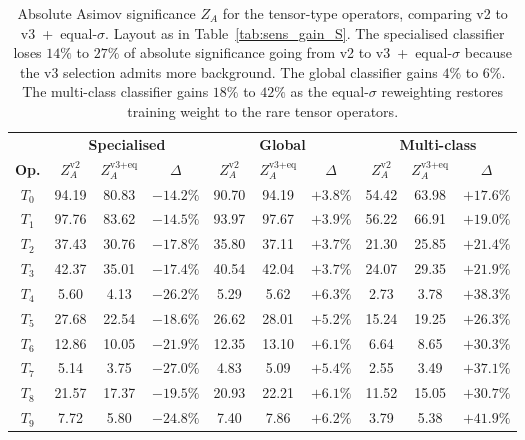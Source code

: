 \begin{table}[htbp]
  \centering
  \caption{Absolute Asimov significance $Z_A$ for the tensor-type operators, comparing v2 to v3~+~equal-$\sigma$. Layout as in Table~\ref{tab:sens_gain_S}. The specialised classifier loses $14\%$ to $27\%$ of absolute significance going from v2 to v3~+~equal-$\sigma$ because the v3 selection admits more background. The global classifier gains $4\%$ to $6\%$. The multi-class classifier gains $18\%$ to $42\%$ as the equal-$\sigma$ reweighting restores training weight to the rare tensor operators.}
  \label{tab:sens_gain_T}
  \begin{tabular}{|c|cc|c|cc|c|cc|c|}
    \hline
    & \multicolumn{3}{c|}{\textbf{Specialised}} & \multicolumn{3}{c|}{\textbf{Global}} & \multicolumn{3}{c|}{\textbf{Multi-class}} \\
    \textbf{Op.} & $Z_A^\text{v2}$ & $Z_A^\text{v3+eq}$ & $\Delta$ & $Z_A^\text{v2}$ & $Z_A^\text{v3+eq}$ & $\Delta$ & $Z_A^\text{v2}$ & $Z_A^\text{v3+eq}$ & $\Delta$ \\
    \hline
    $T_0$ & 94.19 & 80.83 & $-14.2\%$ & 90.70 & 94.19 & $+3.8\%$ & 54.42 & 63.98 & $+17.6\%$ \\
    $T_1$ & 97.76 & 83.62 & $-14.5\%$ & 93.97 & 97.67 & $+3.9\%$ & 56.22 & 66.91 & $+19.0\%$ \\
    $T_2$ & 37.43 & 30.76 & $-17.8\%$ & 35.80 & 37.11 & $+3.7\%$ & 21.30 & 25.85 & $+21.4\%$ \\
    $T_3$ & 42.37 & 35.01 & $-17.4\%$ & 40.54 & 42.04 & $+3.7\%$ & 24.07 & 29.35 & $+21.9\%$ \\
    $T_4$ &  5.60 &  4.13 & $-26.2\%$ &  5.29 &  5.62 & $+6.3\%$ &  2.73 &  3.78 & $+38.3\%$ \\
    $T_5$ & 27.68 & 22.54 & $-18.6\%$ & 26.62 & 28.01 & $+5.2\%$ & 15.24 & 19.25 & $+26.3\%$ \\
    $T_6$ & 12.86 & 10.05 & $-21.9\%$ & 12.35 & 13.10 & $+6.1\%$ &  6.64 &  8.65 & $+30.3\%$ \\
    $T_7$ &  5.14 &  3.75 & $-27.0\%$ &  4.83 &  5.09 & $+5.4\%$ &  2.55 &  3.49 & $+37.1\%$ \\
    $T_8$ & 21.57 & 17.37 & $-19.5\%$ & 20.93 & 22.21 & $+6.1\%$ & 11.52 & 15.05 & $+30.7\%$ \\
    $T_9$ &  7.72 &  5.80 & $-24.8\%$ &  7.40 &  7.86 & $+6.2\%$ &  3.79 &  5.38 & $+41.9\%$ \\
    \hline
  \end{tabular}
\end{table}

